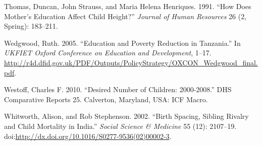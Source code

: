 \documentclass[]{article}
\begin{document}
Thomas, Duncan, John Strauss, and Maria Helena Henriques. 1991. ``How Does Mother's Education Affect Child Height?'' \emph{Journal of Human Resources} 26 (2, Spring): 183--211.

Wedgwood, Ruth. 2005. ``Education and Poverty Reduction in Tanzania.'' In \emph{UKFIET Oxford Conference on Education and Development}, 1--17. \url{http://r4d.dfid.gov.uk/PDF/Outputs/PolicyStrategy/OXCON_Wedgwood_final.pdf}.

Westoff, Charles F. 2010. ``Desired Number of Children: 2000-2008.'' DHS Comparative Reports 25. Calverton, Maryland, USA: ICF Macro.

Whitworth, Alison, and Rob Stephenson. 2002. ``Birth Spacing, Sibling Rivalry and Child Mortality in India.'' \emph{Social Science \& Medicine} 55 (12): 2107--19. doi:\href{https://doi.org/http://dx.doi.org/10.1016/S0277-9536(02)00002-3}{http://dx.doi.org/10.1016/S0277-9536(02)00002-3}.
\end{document}
